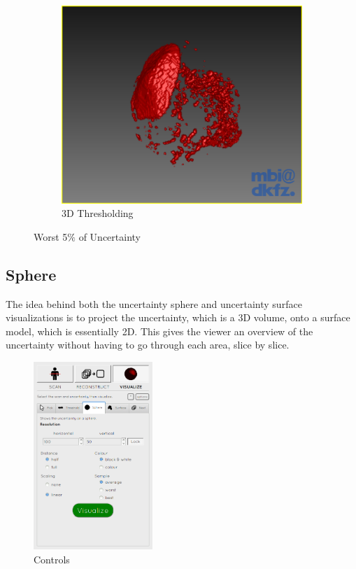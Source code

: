 \begin{figure}[H]
\begin{subfigure}[b]{0.5\textwidth}
    \includegraphics[width=\textwidth]{images/thresholding/thresholding_3d.png}
    \caption{3D Thresholding}\label{fig:threshold_3d}
  \end{subfigure}
  \caption{Worst 5$\%$ of Uncertainty}\label{fig:threshold_settings_result}
\end{figure}

\clearpage
\subsection{Sphere}\label{implementation:sphere}
The idea behind both the uncertainty sphere and uncertainty surface visualizations is to project the uncertainty, which is a 3D volume, onto a surface model, which is essentially 2D. This gives the viewer an overview of the uncertainty without having to go through each area, slice by slice.

\begin{figure}
  \vspace{-20pt}
  \includegraphics[width=0.4\textwidth]{images/tool/3_sphere.png}
  \caption{Controls}\label{fig:sphere_settings}
\end{figure}

